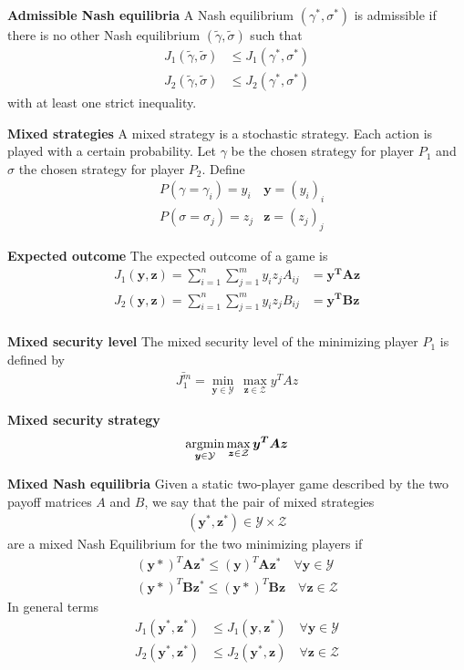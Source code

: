 \textbf{Admissible Nash equilibria} \newline
A Nash equilibrium $(\gamma^*, \sigma^*)$ is admissible if there is no other Nash
equilibrium $(\tilde{\gamma}, \tilde\sigma)$ such that
\begin{align*}
    J_1(\tilde\gamma, \tilde\sigma) &\leq J_1(\gamma^*, \sigma^*) \\
    J_2(\tilde\gamma, \tilde\sigma) &\leq J_2(\gamma^*, \sigma^*)
\end{align*}
with at least one strict inequality.


\textbf{Mixed strategies} \newline
A mixed strategy is a stochastic strategy. Each action is played with a certain
probability. Let $\gamma$ be the chosen strategy for player $P_1$ and $\sigma$
the chosen strategy for player $P_2$. Define
\begin{align*}
    & P(\gamma = \gamma_i) = y_i & \bm{y} = (y_i)_i \\
    & P(\sigma = \sigma_j) = z_j & \bm{z} = (z_j)_j
\end{align*}


\textbf{Expected outcome} \newline
The expected outcome of a game is
\begin{align*}
    J_1(\bm{y}, \bm{z}) = \sum_{i=1}^n \sum_{j=1}^m y_i z_j A_{ij}  &= \bm{y^TAz}\\
    J_2(\bm{y}, \bm{z}) = \sum_{i=1}^n \sum_{j=1}^m y_i z_j B_{ij}  &= \bm{y^TBz}\\
\end{align*}


\textbf{Mixed security level}
The mixed security level of the minimizing player $P_1$ is defined by
\begin{align*}
    \bar{J_1^m} = \min_{\bm{y} \in \mathcal{Y}} \, \max_{\bm{z} \in \mathcal{Z}} y^TAz
\end{align*}


\textbf{Mixed security strategy}
\begin{align*}
    \operatorname*{argmin}_{\bm{y}\in\mathcal{Y}} \max_{\bm{z}\in\mathcal{Z}} \bm{y^TAz}
\end{align*}


\textbf{Mixed Nash equilibria}
Given a static two-player game described by the two payoff matrices $A$ and $B$,
we say that the pair of mixed strategies 
\begin{align*}
    (\bm{y}^*, \bm{z}^*) \in \mathcal{Y}\times\mathcal{Z}
\end{align*}
are a mixed Nash Equilibrium for the two minimizing players if
\begin{align*}
    (\bm{y*})^T\bm{A}\bm{z^*} \leq (\bm{y})^T\bm{A}\bm{z^*} \quad \forall \bm{y} \in \mathcal{Y} \\
    (\bm{y*})^T\bm{B}\bm{z^*} \leq (\bm{y*})^T\bm{B}\bm{z} \quad \forall \bm{z} \in \mathcal{Z}
\end{align*}
In general terms
\begin{align*}
    J_1(\bm{y^*}, \bm{z^*}) &\leq J_1(\bm{y}, \bm{z^*}) \quad \forall \bm{y} \in \mathcal{Y} \\
    J_2(\bm{y^*}, \bm{z^*}) &\leq J_2(\bm{y^*}, \bm{z}) \quad \forall \bm{z} \in \mathcal{Z}
\end{align*}